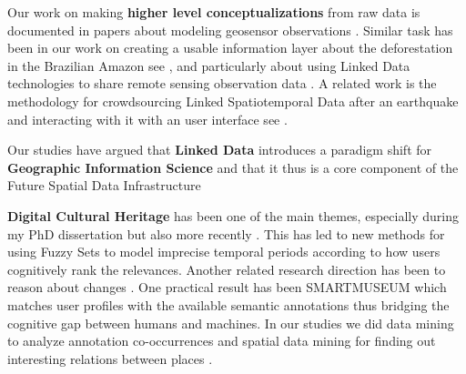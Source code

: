 \documentclass[11pt,letterpaper]{article}
\begin{document}
Our work on making \textbf{higher level conceptualizations} from raw data is documented in papers about modeling geosensor observations
  		\cite{devaraju-kauppinen-sensors-2010}
  		\cite{modeling-sensor-observations-2012}. Similar task has been in our work on creating a usable information layer about the deforestation in the Brazilian Amazon see
  		\cite{kauppinen2011a} \cite{kauppinen2010e}, and particularly about using
  		Linked Data technologies to share remote sensing observation data
  		\cite{kauppinen-remote-sensing-data-2012}. A related work is the methodology for crowdsourcing Linked Spatiotemporal Data after an earthquake and interacting with it with an user interface see
  		\cite{crowdsourcing-lod-2011} \cite{kauppinen-visualizing-2013}.

Our studies have argued that \textbf{Linked Data} introduces a paradigm shift for \textbf{Geographic Information Science} \cite{linkeddata-paradigmshift-2014} and that it thus is a core component of the Future Spatial Data Infrastructure \cite{futureSDI-2012}

\textbf{Digital Cultural Heritage} has been one of the main themes, especially during my PhD dissertation
 		\cite{kauppinen-dissertation-2010} but also more recently \cite{semantic-gazetteer-2021}. This has led to new methods for using Fuzzy Sets to model imprecise temporal periods
  		\cite{kauppinen-et-al-temporal-relevance-2010} according to how users cognitively rank the relevances. Another related research direction has been to reason about changes \cite{kauppinen-et-al-geospatio-temporal-2010}. One practical result has been SMARTMUSEUM
		\cite{kauppinen-et-al-smartmuseum-2009,smartmuseum-eva-2009,Ruotsalo-smartmuseum:2009,smartmuseum2013} which matches user profiles with the available semantic annotations thus bridging the cognitive gap between humans and machines. In our studies we did data mining to analyze annotation co-occurrences
		\cite{kauppinen-et-al-extending-ci-2008}
and spatial data mining for finding out interesting relations between places
		\cite{kauppinen-et-al-learning-eswc-2009}.
\end{document}
